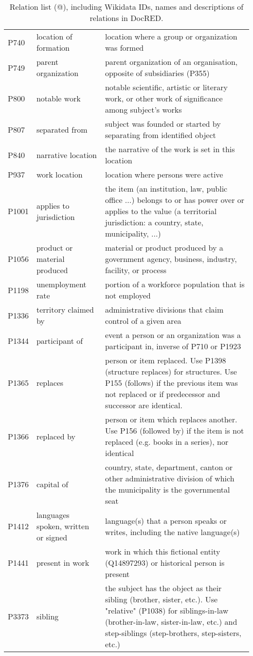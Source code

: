 \documentclass[11pt,a4paper]{article}
\makeatletter
\newcommand{\Rmnum}[1]{\expandafter\@slowromancap\romannumeral #1@}
\makeatother
\begin{document}
\begin{table*}[thp!]
{\begin{tabular}{p{} | p{} | p{}}
P740 & location of formation & location where a group or organization was formed \\
P749 & parent organization & parent organization of an organisation, opposite of subsidiaries (P355) \\
P800 & notable work & notable scientific, artistic or literary work, or other work of significance among subject's works \\
P807 & separated from & subject was founded or started by separating from identified object \\
P840 & narrative location & the narrative of the work is set in this location \\
P937 & work location & location where persons were active \\
P1001 & applies to jurisdiction & the item (an institution, law, public office ...) belongs to or has power over or applies to the value (a territorial jurisdiction: a country, state, municipality, ...) \\
P1056 & product or material produced & material or product produced by a government agency, business, industry, facility, or process \\
P1198 & unemployment rate & portion of a workforce population that is not employed \\
P1336 & territory claimed by & administrative divisions that claim control of a given area \\
P1344 & participant of & event a person or an organization was a participant in, inverse of P710 or P1923 \\
P1365 & replaces & person or item replaced. Use P1398 (structure replaces) for structures. Use P155 (follows) if the previous item was not replaced or if predecessor and successor are identical. \\
P1366 & replaced by & person or item which replaces another. Use P156 (followed by) if the item is not replaced (e.g. books in a series), nor identical \\
P1376 & capital of & country, state, department, canton or other administrative division of which the municipality is the governmental seat \\
P1412 & languages spoken, written or signed & language(s) that a person speaks or writes, including the native language(s) \\
P1441 & present in work & work in which this fictional entity (Q14897293) or historical person is present \\
P3373 & sibling & the subject has the object as their sibling (brother, sister, etc.). Use "relative" (P1038) for siblings-in-law (brother-in-law, sister-in-law, etc.) and step-siblings (step-brothers, step-sisters, etc.) \\




\bottomrule
\end{tabular}}
\caption{Relation list (\Rmnum{2}), including Wikidata IDs, names and descriptions of relations in DocRED.}
\label{table:relation list2}
\end{table*}
\end{document}
